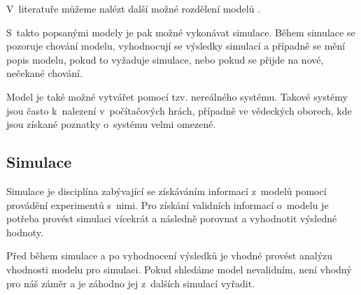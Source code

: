V~literatuře můžeme nalézt další možné rozdělení modelů \cite{Cellierc2006}.
\newline

S~takto popsanými modely je pak možné vykonávat simulace. Během simulace se pozoruje chování modelu, vyhodnocují se výsledky simulací a případně se mění popis modelu, pokud to vyžaduje simulace, nebo pokud se přijde na nové, nečekané chování.

Model je také možné vytvářet pomocí tzv. nereálného systému. Takové systémy jsou často k~nalezení v~počítačových hrách, případně ve vědeckých oborech, kde jsou získané poznatky o~systému velmi omezené.

\subsection{Simulace}
Simulace je disciplína zabývající se získáváním informací z~modelů pomocí provádění experimentů s~nimi. Pro získání validních informací o~modelu je potřeba provést simulaci vícekrát a následně porovnat a vyhodnotit výsledné hodnoty.

Před během simulace a po vyhodnocení výsledků je vhodné provést analýzu vhodnosti modelu pro simulaci. Pokud shledáme model nevalidním, není vhodný pro náš záměr a je záhodno jej z~dalších simulací vyřadit.


